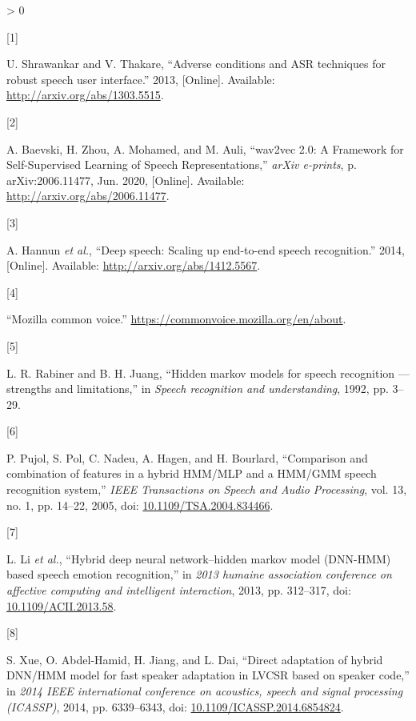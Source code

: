 \documentclass[
  a4paper,
]{article}
\newlength{\cslhangindent}
\newlength{\csllabelwidth}
\newenvironment{CSLReferences}[2] %
 {%
  \setlength{\parindent}{0pt}
  \ifodd #1 \everypar{\setlength{\hangindent}{\cslhangindent}}\ignorespaces\fi
  \ifnum #2 > 0
  \setlength{\parskip}{#2\baselineskip}
  \fi
 }%
 {}
\newcommand{\CSLLeftMargin}[1]{\parbox[t]{\csllabelwidth}{#1}}
\newcommand{\CSLRightInline}[1]{\parbox[t]{\linewidth - \csllabelwidth}{#1}\break}
\begin{document}
\hypertarget{refs}{}
\begin{CSLReferences}{0}{0}
\leavevmode\hypertarget{ref-shrawankar2013adverse}{}%
\CSLLeftMargin{{[}1{]} }
\CSLRightInline{U. Shrawankar and V. Thakare, {``Adverse conditions and
ASR techniques for robust speech user interface.''} 2013, {[}Online{]}.
Available: \url{http://arxiv.org/abs/1303.5515}.}

\leavevmode\hypertarget{ref-2020arXiv200611477B}{}%
\CSLLeftMargin{{[}2{]} }
\CSLRightInline{A. Baevski, H. Zhou, A. Mohamed, and M. Auli,
{``{wav2vec 2.0: A Framework for Self-Supervised Learning of Speech
Representations},''} \emph{arXiv e-prints}, p. arXiv:2006.11477, Jun.
2020, {[}Online{]}. Available: \url{http://arxiv.org/abs/2006.11477}.}

\leavevmode\hypertarget{ref-hannun2014deep}{}%
\CSLLeftMargin{{[}3{]} }
\CSLRightInline{A. Hannun \emph{et al.}, {``Deep speech: Scaling up
end-to-end speech recognition.''} 2014, {[}Online{]}. Available:
\url{http://arxiv.org/abs/1412.5567}.}

\leavevmode\hypertarget{ref-Mozilla}{}%
\CSLLeftMargin{{[}4{]} }
\CSLRightInline{{``Mozilla common voice.''}
\url{https://commonvoice.mozilla.org/en/about}.}

\leavevmode\hypertarget{ref-hmm}{}%
\CSLLeftMargin{{[}5{]} }
\CSLRightInline{L. R. Rabiner and B. H. Juang, {``Hidden markov models
for speech recognition --- strengths and limitations,''} in \emph{Speech
recognition and understanding}, 1992, pp. 3--29.}

\leavevmode\hypertarget{ref-1369308}{}%
\CSLLeftMargin{{[}6{]} }
\CSLRightInline{P. Pujol, S. Pol, C. Nadeu, A. Hagen, and H. Bourlard,
{``Comparison and combination of features in a hybrid HMM/MLP and a
HMM/GMM speech recognition system,''} \emph{IEEE Transactions on Speech
and Audio Processing}, vol. 13, no. 1, pp. 14--22, 2005, doi:
\href{https://doi.org/10.1109/TSA.2004.834466}{10.1109/TSA.2004.834466}.}

\leavevmode\hypertarget{ref-6681449}{}%
\CSLLeftMargin{{[}7{]} }
\CSLRightInline{L. Li \emph{et al.}, {``Hybrid deep neural
network--hidden markov model (DNN-HMM) based speech emotion
recognition,''} in \emph{2013 humaine association conference on
affective computing and intelligent interaction}, 2013, pp. 312--317,
doi: \href{https://doi.org/10.1109/ACII.2013.58}{10.1109/ACII.2013.58}.}

\leavevmode\hypertarget{ref-6854824}{}%
\CSLLeftMargin{{[}8{]} }
\CSLRightInline{S. Xue, O. Abdel-Hamid, H. Jiang, and L. Dai, {``Direct
adaptation of hybrid DNN/HMM model for fast speaker adaptation in LVCSR
based on speaker code,''} in \emph{2014 IEEE international conference on
acoustics, speech and signal processing (ICASSP)}, 2014, pp. 6339--6343,
doi:
\href{https://doi.org/10.1109/ICASSP.2014.6854824}{10.1109/ICASSP.2014.6854824}.}


\end{CSLReferences}
\end{document}
